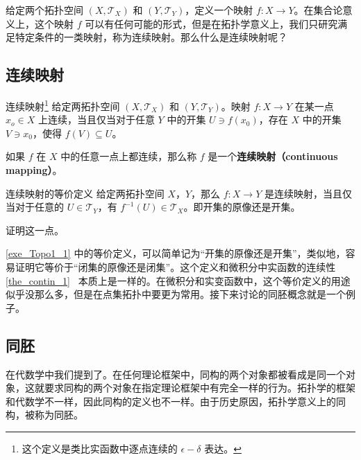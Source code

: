 

给定两个拓扑空间 $(X, \mathcal{T}_X)$ 和 $(Y, \mathcal{T}_Y)$，定义一个映射 $f:X\rightarrow Y$。在集合论意义上，这个映射 $f$ 可以有任何可能的形式，但是在拓扑学意义上，我们只研究满足特定条件的一类映射，称为连续映射。那么什么是连续映射呢？

\subsection{连续映射}
\begin{definition}{连续映射\footnote{这个定义是类比实函数中逐点连续的 $\epsilon-\delta$ 表达。}}
给定两拓扑空间 $(X, \mathcal{T}_X)$ 和 $(Y, \mathcal{T}_Y)$。映射 $f:X\rightarrow Y$ 在某一点 $x_o\in X$ 上连续，当且仅当对于任意 $Y$ 中的开集 $U\ni f(x_0)$，存在 $X$ 中的开集 $V\ni x_0$，使得 $f(V)\subseteq U$。

如果 $f$ 在 $X$ 中的任意一点上都连续，那么称 $f$ 是一个\textbf{连续映射（continuous mapping）}。
\end{definition}

\begin{exercise}{连续映射的等价定义}\label{exe_Topo1_1}
给定两拓扑空间 $X$，$Y$，那么 $f:X\rightarrow Y$ 是连续映射，当且仅当对于任意的 $U\in\mathcal{T}_Y$，有 $f^{-1}(U)\in\mathcal{T}_X$。即开集的原像还是开集。

证明这一点。
\end{exercise}

\autoref{exe_Topo1_1} 中的等价定义，可以简单记为“开集的原像还是开集”，类似地，容易证明它等价于“闭集的原像还是闭集”。这个定义和微积分中实函数的连续性\autoref{the_contin_1}~ 本质上是一样的。在微积分和实变函数中，这个等价定义的用途似乎没那么多，但是在点集拓扑中要更为常用。接下来讨论的同胚概念就是一个例子。

\subsection{同胚}

在代数学中我们提到了。在任何理论框架中，同构的两个对象都被看成是同一个对象，这就要求同构的两个对象在指定理论框架中有完全一样的行为。拓扑学的框架和代数学不一样，因此同构的定义也不一样。由于历史原因，拓扑学意义上的同构，被称为同胚。

